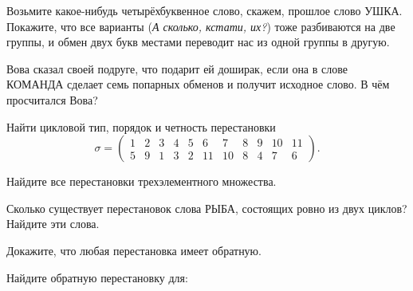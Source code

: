 \begin{tasks}
    \item Возьмите какое-нибудь четырёхбуквенное слово, скажем, прошлое слово \textsf{УШКА}.
        Покажите, что все варианты (\emph{А сколько, кстати, их?}) тоже разбиваются на две группы,
        и обмен двух букв местами переводит нас из одной группы в другую.
    \item Вова сказал своей подруге, что подарит ей доширак,
        если она в слове \textsf{КОМАНДА} сделает семь попарных обменов и получит исходное слово.
        В чём просчитался Вова?
    \item Найти цикловой тип, порядок и четность перестановки
        \[
            \sigma = \begin{pmatrix}
                1 & 2 & 3 & 4 & 5 & 6 & 7 & 8 & 9 & 10 & 11 \\
                5 & 9 & 1 & 3 & 2 & 11 & 10 & 8 & 4 & 7 & 6
            \end{pmatrix}.
        \]
    \item Найдите все перестановки трехэлементного множества.
    \item Сколько существует перестановок слова \textsf{РЫБА}, состоящих ровно
        из двух циклов? Найдите эти слова.
    \item Докажите, что любая перестановка имеет обратную.
    \item Найдите обратную перестановку для: 


\end{tasks}
